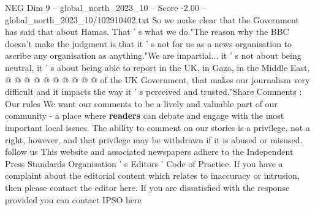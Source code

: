 \begin{textsample}{NEG Dim 9 – global\_north\_2023\_10 – Score -2.00 – global\_north\_2023\_10/102910402.txt}
So we make clear that the Government has said that about Hamas.
That ' s what we do."The reason why the BBC doesn't make the judgment is that it ' s not for us as a news organisation to ascribe any organisation as anything."We are impartial... it ' s not about being neutral, it ' s about being able to report in the UK, in Gaza, in the Middle East, @ @ @ @ @ @ @ @ @ @ of the UK Government, that makes our journalism very difficult and it impacts the way it ' s perceived and trusted."Share Comments : Our rules We want our comments to be a lively and valuable part of our community - a place where \textbf{readers} can debate and engage with the most important local issues.
The ability to comment on our stories is a privilege, not a right, however, and that privilege may be withdrawn if it is abused or misused. follow us This website and associated newspapers adhere to the Independent Press Standards Organisation ' s Editors ' Code of Practice.
If you have a complaint about the editorial content which relates to inaccuracy or intrusion, then please contact the editor here.
If you are dissatisfied with the response provided you can contact IPSO here

\end{textsample}
